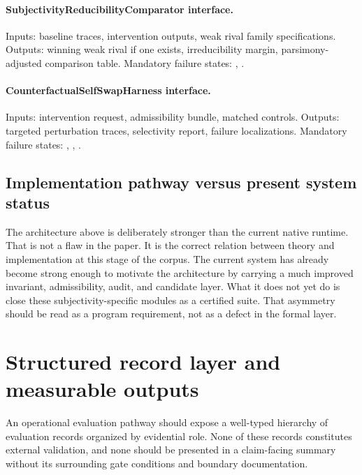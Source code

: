 \documentclass[11pt,a4paper]{article}
\theoremstyle{definition}
\begin{document}
\paragraph{SubjectivityReducibilityComparator interface.}
Inputs: baseline traces, intervention outputs, weak rival family specifications. Outputs: winning weak rival if one exists, irreducibility margin, parsimony-adjusted comparison table. Mandatory failure states: \texttt{\allowbreak{}\allowbreak{}\allowbreak{}}, \texttt{\allowbreak{}\allowbreak{}\allowbreak{}}.

\paragraph{CounterfactualSelfSwapHarness interface.}
Inputs: intervention request, admissibility bundle, matched controls. Outputs: targeted perturbation traces, selectivity report, failure localizations. Mandatory failure states: \texttt{\allowbreak{}\allowbreak{}}, \texttt{\allowbreak{}\allowbreak{}}, \texttt{\allowbreak{}}.

\subsection{Implementation pathway versus present system status}
The architecture above is deliberately stronger than the current native runtime. That is not a flaw in the paper. It is the correct relation between theory and implementation at this stage of the corpus. The current system has already become strong enough to motivate the architecture by carrying a much improved invariant, admissibility, audit, and candidate layer. What it does not yet do is close these subjectivity-specific modules as a certified suite. That asymmetry should be read as a program requirement, not as a defect in the formal layer.

\section{Structured record layer and measurable outputs}
An operational evaluation pathway should expose a well-typed hierarchy of evaluation records organized by evidential role. None of these records constitutes external validation, and none should be presented in a claim-facing summary without its surrounding gate conditions and boundary documentation.
\end{document}
